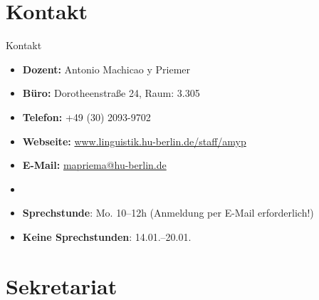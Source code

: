 
	
%
\section{Kontakt}
%

\begin{frame}{Kontakt}

\begin{itemize}
	\item \textbf{Dozent:} Antonio Machicao y Priemer 
	
	\item \textbf{Büro:} Dorotheenstraße 24, Raum: 3.305
	
	\item \textbf{Telefon:} +49 (30) 2093-9702
	
	\item \textbf{Webseite:} \url{www.linguistik.hu-berlin.de/staff/amyp}
	
	\item \textbf{E-Mail:} \href{mailto:mapriema@hu-berlin.de}{mapriema@hu-berlin.de}
	\item[]
	
	\item \textbf{Sprechstunde}: Mo. 10--12h (Anmeldung per E-Mail erforderlich!)
	\item[] \textbf{Keine Sprechstunden}: 14.01.--20.01.
\end{itemize}	

\end{frame}


\section{Sekretariat}

